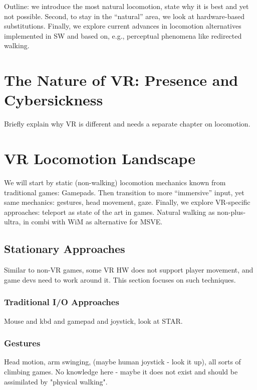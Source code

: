 Outline: we introduce the most natural locomotion, state why it is best and yet not possible. Second, to stay in the “natural” area, we look at hardware-based substitutions. Finally, we explore current advances in locomotion alternatives implemented in SW and based on, e.g., perceptual phenomena like redirected walking.


\section{The Nature of VR: Presence and Cybersickness}

Briefly explain why VR is different and needs a separate chapter on locomotion.





\section{VR Locomotion Landscape}

We will start by static (non-walking) locomotion mechanics known from traditional games: Gamepads. Then transition to more “immersive” input, yet same mechanics: gestures, head movement, gaze. Finally, we explore VR-specific approaches: teleport as state of the art in games. Natural walking as non-plus-ultra, in combi with WiM as alternative for MSVE.




\subsection{Stationary Approaches}

Similar to non-VR games, some VR HW does not support player movement, and game devs need to work around it. This section focuses on such techniques.



\subsubsection{Traditional I/O Approaches}
Mouse and kbd and gamepad and joystick, look at STAR.



\subsubsection{Gestures}
Head motion, arm swinging, (maybe human joystick - look it up), all sorts of climbing games. No knowledge here - maybe it does not exist and should be assimilated by "physical walking".



